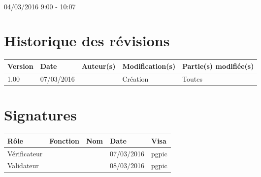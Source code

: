 \documentclass [a4paper] {article}
\begin{document}
04/03/2016			 				%
\hfill   
\hfill 	 9:00 - 10:07 				%


\section*{Historique des révisions}
\begin{center}
			\begin{tabular}{| p{2.5cm} | p{3cm} | p{3cm} | p{3cm} | p{3.5cm} |}
				\hline
				\rowcolor{Gray}
				Version & Date & Auteur(s) & Modification(s) & Partie(s) modifiée(s)		 \\
				\hline
				1.00 & 07/03/2016 & \Pierre & Création & Toutes \\
		\hline		
			\end{tabular}
		\end{center}

\section*{Signatures}

		\begin{center}
			\begin{tabular}{| p{2.5cm} | p{4cm} | p{3cm} | p{3cm} | p{2.5cm} |}
				\hline
				\rowcolor{Gray}
				Rôle & Fonction & Nom & Date & Visa		 \\
				\hline
				Vérificateur & \RQA & \Kafui & 07/03/2016 & pgpic \\[30pt]
				\hline
				Validateur & \CP & \Sergi & 08/03/2016 & pgpic \\[30pt]	
				\hline
			\end{tabular}
		\end{center}

\end{document}
